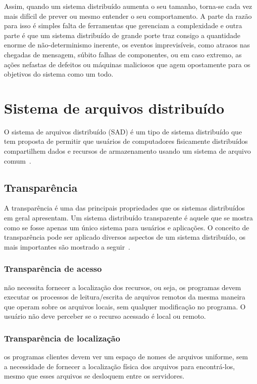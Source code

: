 	Assim, quando um sistema distribuído aumenta o seu tamanho, torna-se cada vez mais difícil de prever ou mesmo entender o seu comportamento. A parte da razão para isso é simples falta de ferramentas que gerenciam a complexidade e outra parte é que um sistema distribuído de grande porte traz consigo a quantidade enorme de não-determinismo inerente, os eventos imprevisíveis, como atrasos nas chegadas de mensagem, súbito falhas de componentes, ou em caso extremo, as ações nefastas de defeitos ou máquinas maliciosos que agem opostamente para os objetivos do sistema como um todo.
	
	\section{Sistema de arquivos distribuído}
	
	O sistema de arquivos distribuído (SAD) é um tipo de sistema distribuído que tem proposta de permitir que usuários de computadores fisicamente distribuídos compartilhem dados e recursos de armazenamento usando um sistema de arquivo comum~\cite{levy90}.
	
	\subsection{Transparência}
	A transparência é uma das principais propriedades que os sistemas distribuídos em geral apresentam. Um sistema distribuído transparente é aquele que se mostra como se fosse apenas um único sistema para usuários e aplicações. O conceito de transparência pode ser aplicado diversos aspectos de um sistema distribuído, os mais importantes são mostrado a seguir~\cite{tanenbaum07}.	

	\subsubsection{Transparência de acesso} não necessita fornecer a localização dos recursos, ou seja, os programas devem executar os processos de leitura/escrita de arquivos remotos da mesma maneira que operam sobre os arquivos locais, sem qualquer modificação no programa. O usuário não deve perceber se o recurso acessado é
	local ou remoto.
	
	\subsubsection{Transparência de localização} os programas clientes devem ver um espaço de nomes de arquivos uniforme, sem a necessidade de fornecer a localização física dos arquivos para encontrá-los, mesmo que esses arquivos se desloquem entre os servidores.
	

